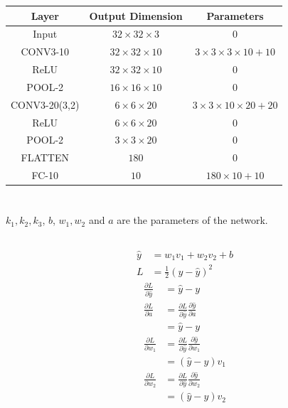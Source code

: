 \documentclass{article}
\numberwithin{equation}{section}
\begin{document}
\begin{table}[H]
\centering
\begin{tabular}{|c|c|c|}
\hline 
Layer & Output Dimension & Parameters \\
\hline
Input & \(32 \times 32 \times 3\) & 0 \\
\hline
CONV3-10 & \(32 \times 32 \times 10\) & \(3 \times 3 \times 3 \times 10 + 10\) \\
\hline
ReLU & \(32 \times 32 \times 10\) & 0 \\
\hline
POOL-2 & \(16 \times 16 \times 10\) & 0 \\
\hline
CONV3-20(3,2) & \(6 \times 6 \times 20\) & \(3 \times 3 \times 10 \times 20 + 20\) \\
\hline
ReLU & \(6 \times 6 \times 20\) & 0 \\
\hline
POOL-2 & \(3 \times 3 \times 20\) & 0 \\
\hline
FLATTEN & \(180\) & 0 \\
\hline
FC-10 & \(10\) & \(180 \times 10 + 10\)\\
\hline
\end{tabular}
\end{table}

\section{}
\subsection{}
\(k_1, k_2, k_3\), \(b\), \(w_1, w_2\) and \(a\) are the parameters of the network.
\subsection{}
\begin{align}
\hat{y} &= w_1v_1 + w_2v_2 + b \\
L &= \frac{1}{2}(y - \hat{y})^2
\end{align}
\begin{align}
\frac{\partial L}{\partial \hat{y}} &= \hat{y} - y \\
\frac{\partial L}{\partial a} &= \frac{\partial L}{\partial \hat{y}} \frac{\partial \hat{y}}{\partial a} \\
&= \hat{y} - y\\
\frac{\partial L}{\partial w_1} &= \frac{\partial L}{\partial \hat{y}} \frac{\partial \hat{y}}{\partial w_1} \\
&= (\hat{y} - y)v_1\\
\frac{\partial L}{\partial w_2} &= \frac{\partial L}{\partial \hat{y}} \frac{\partial \hat{y}}{\partial w_2} \\
&= (\hat{y} - y)v_2
\end{align}
\end{document}
